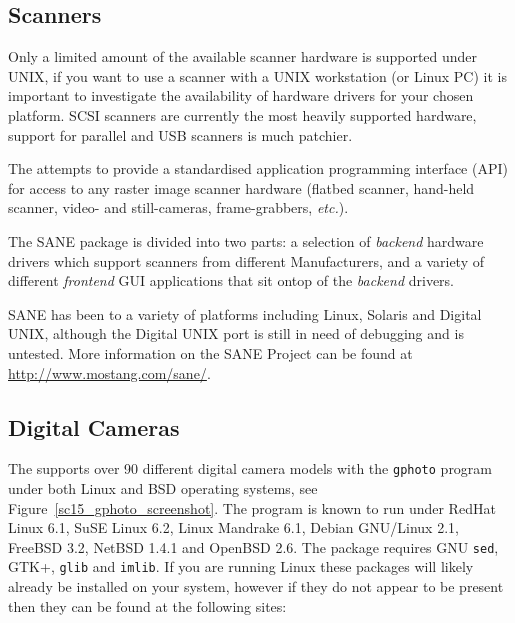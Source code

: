 \documentclass[twoside,11pt]{starlink}
\begin{document}
\subsection{Scanners\label{sc15_scanners}}

Only a limited amount of the available scanner hardware is supported
under UNIX, if you want to use a scanner with a UNIX workstation (or
Linux PC) it is important to investigate the availability of hardware
drivers for your chosen platform. SCSI scanners are currently the most
heavily supported hardware, support for parallel and USB scanners is
much patchier.

The 
attempts to provide a standardised application programming interface
(API) for access to any raster image scanner hardware (flatbed
scanner, hand-held scanner, video- and still-cameras, frame-grabbers,
\emph{etc.}).

The SANE package is divided into two parts: a selection of \emph{backend} hardware drivers which support scanners from different
Manufacturers, and a variety of different \emph{frontend} GUI
applications that sit ontop of the \emph{backend} drivers.

SANE has been
to a variety of platforms including Linux, Solaris and Digital UNIX,
although the Digital UNIX port is still in need of debugging and is
untested. More information on the SANE Project can be found at
\url{http://www.mostang.com/sane/}.

\subsection{Digital Cameras\label{sc15_camera}}

The  supports over 90 different
digital camera models with the \texttt{gphoto} program under both Linux
and BSD operating systems, see Figure~\ref{sc15_gphoto_screenshot}.
The program is known to run under RedHat Linux 6.1, SuSE Linux 6.2,
Linux Mandrake 6.1, Debian GNU/Linux 2.1, FreeBSD 3.2, NetBSD 1.4.1
and OpenBSD 2.6. The package requires GNU \texttt{sed}, GTK+, \texttt{glib}
and \texttt{imlib}. If you are running Linux these packages will likely
already be installed on your system, however if they do not appear to
be present then they can be found at the following sites:
\end{document}
